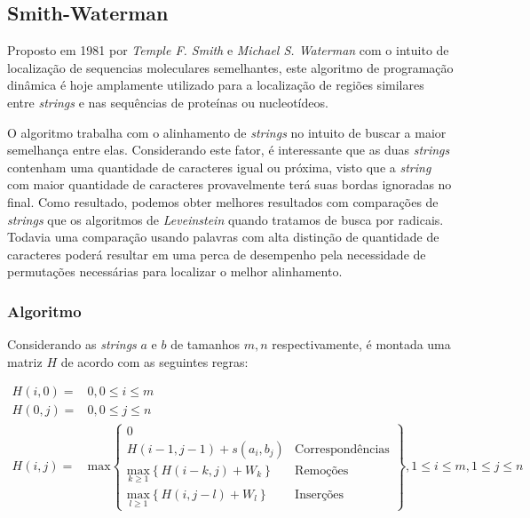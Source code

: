 \subsection{Smith-Waterman} %
\label{sec:smith_waterman}


Proposto em 1981 por \textit{Temple F. Smith} e \textit{Michael S. Waterman}\cite{smith1981identification} com o intuito de localização de sequencias moleculares semelhantes, este algoritmo de programação dinâmica é hoje amplamente utilizado para a localização de regiões similares entre \textit{strings} e nas sequências de proteínas ou nucleotídeos.

O algoritmo trabalha com o alinhamento de \textit{strings} no intuito de  buscar a maior semelhança entre elas. Considerando este fator, é interessante que as duas \textit{strings} contenham uma quantidade de caracteres igual ou próxima, visto que  a \textit{string} com  maior quantidade de caracteres provavelmente terá suas bordas ignoradas no final. Como resultado, podemos obter melhores resultados com comparações de \textit{strings} que os algoritmos de \textit{Leveinstein} quando tratamos de busca por radicais. Todavia uma comparação usando palavras com alta distinção de quantidade de caracteres poderá resultar em uma perca de desempenho pela necessidade de permutações necessárias para localizar o melhor alinhamento.

\subsubsection{Algoritmo} %
\label{sub:algoritmo}

Considerando as \textit{strings} $a$ e $b$ de tamanhos $m,n$ respectivamente, é montada uma matriz $H$ de acordo com as seguintes regras:

\begin{align*}
	H(i,0) =& 0, 0 \leq i \leq m \\
	H(0,j) =& 0, 0 \leq j \leq n \\
	H(i,j) =& \text{max}
	\begin{Bmatrix}
		0  &\\
		H(i-1,j-1) + s(a_i,b_j) & \text{Correspondências}\\
		\underset{k\geq1}{\text{max}} \left\{H(i-k,j) + W_k\right\} & \text{Remoções}\\
		\underset{l\geq1}{\text{max}} \left\{H(i,j-l) + W_l\right\} & \text{Inserções}
	\end{Bmatrix}, 1 \leq i \leq m, 1 \leq j \leq n
\end{align*}

